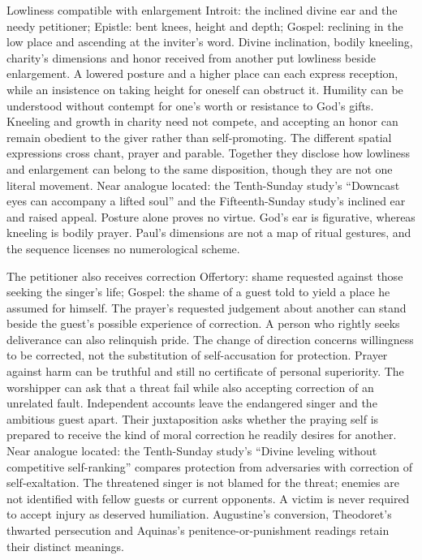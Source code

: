 \begin{proposal}{Lowliness compatible with enlargement}
 Introit: the inclined divine ear and the needy petitioner; Epistle: bent knees, height and depth; Gospel: reclining in the low place and ascending at the inviter's word.
 Divine inclination, bodily kneeling, charity's dimensions and honor received from another put lowliness beside enlargement. A lowered posture and a higher place can each express reception, while an insistence on taking height for oneself can obstruct it.
 Humility can be understood without contempt for one's worth or resistance to God's gifts. Kneeling and growth in charity need not compete, and accepting an honor can remain obedient to the giver rather than self-promoting.
 The different spatial expressions cross chant, prayer and parable. Together they disclose how lowliness and enlargement can belong to the same disposition, though they are not one literal movement.
 Near analogue located: the Tenth-Sunday study's ``Downcast eyes can accompany a lifted soul'' and the Fifteenth-Sunday study's inclined ear and raised appeal.
 Posture alone proves no virtue. God's ear is figurative, whereas kneeling is bodily prayer. Paul's dimensions are not a map of ritual gestures, and the sequence licenses no numerological scheme.
\end{proposal}

\begin{proposal}{The petitioner also receives correction}
 Offertory: shame requested against those seeking the singer's life; Gospel: the shame of a guest told to yield a place he assumed for himself.
 The prayer's requested judgement about another can stand beside the guest's possible experience of correction. A person who rightly seeks deliverance can also relinquish pride. The change of direction concerns willingness to be corrected, not the substitution of self-accusation for protection.
 Prayer against harm can be truthful and still no certificate of personal superiority. The worshipper can ask that a threat fail while also accepting correction of an unrelated fault.
 Independent accounts leave the endangered singer and the ambitious guest apart. Their juxtaposition asks whether the praying self is prepared to receive the kind of moral correction he readily desires for another.
 Near analogue located: the Tenth-Sunday study's ``Divine leveling without competitive self-ranking'' compares protection from adversaries with correction of self-exaltation.
 The threatened singer is not blamed for the threat; enemies are not identified with fellow guests or current opponents. A victim is never required to accept injury as deserved humiliation. Augustine's conversion, Theodoret's thwarted persecution and Aquinas's penitence-or-punishment readings retain their distinct meanings.
\end{proposal}


